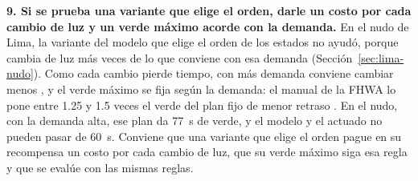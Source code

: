 \noindent\textbf{9. Si se prueba una variante que elige el orden, darle
un costo por cada cambio de luz y un verde máximo acorde con la
demanda.} En el nudo de Lima, la variante del modelo que elige el orden
de los estados no ayudó, porque cambia de luz más veces de lo que
conviene con esa demanda (Sección~\ref{sec:lima-nudo}). Como cada cambio
pierde tiempo, con más demanda conviene cambiar menos
\citep{Wang2022_SwitchingLoss}, y el verde máximo se fija según la
demanda: el manual de la FHWA lo pone entre 1.25 y 1.5 veces el verde
del plan fijo de menor retraso \citep[p.~5-11]{Koonce2008_TSTM}. En el
nudo, con la demanda alta, ese plan da 77~s de verde, y el modelo y el
actuado no pueden pasar de 60~s. Conviene que una variante que elige el
orden pague en su recompensa un costo por cada cambio de luz, que su
verde máximo siga esa regla y que se evalúe con las mismas reglas.
